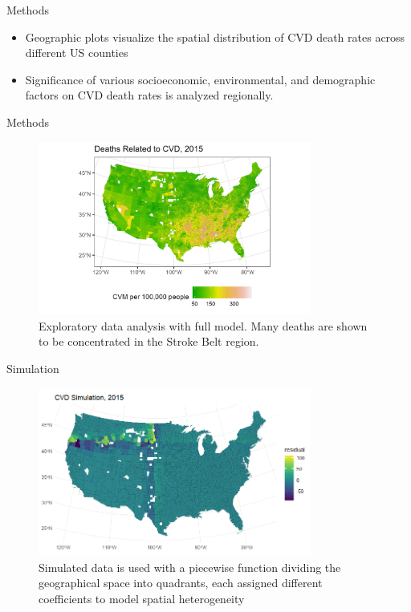 \documentclass[
  ignorenonframetext,
]{beamer}
\begin{document}
\begin{frame}{Methods}
\label{methods-2}
\begin{itemize}
\item
  Geographic plots visualize the spatial distribution of CVD death rates
  across different US counties
\item
  Significance of various socioeconomic, environmental, and demographic
  factors on CVD death rates is analyzed regionally.
\end{itemize}
\end{frame}

\begin{frame}{Methods}
\label{methods-3}
\begin{figure}[H]

{\centering \includegraphics[width=0.8\textwidth,height=\textheight]{PresentationPhotos/edaplot.png}

}

\caption{Exploratory data analysis with full model. Many deaths are
shown to be concentrated in the Stroke Belt region.}

\end{figure}%
\end{frame}

\begin{frame}{Simulation}
\label{simulation}
\begin{figure}[H]

{\centering \includegraphics[width=0.8\textwidth,height=\textheight]{PresentationPhotos/simplot.png}

}

\caption{Simulated data is used with a piecewise function dividing the
geographical space into quadrants, each assigned different coefficients
to model spatial heterogeneity}

\end{figure}%
\end{frame}
\end{document}
